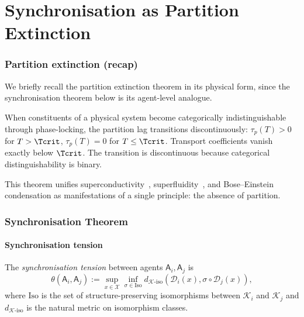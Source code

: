 \documentclass[11pt,twocolumn,a4paper]{article}
\newcommand{\K}{\mathcal{K}}
\newcommand{\D}{\mathcal{D}}
\newcommand{\X}{\mathcal{X}}
\newcommand{\agent}{\mathsf{A}}
\newcommand{\tauP}{\tau_p}
\begin{document}
\part{Synchronisation as Partition Extinction}

\section{Partition extinction (recap)}
\label{sec:partition-extinct}

We briefly recall the partition extinction theorem in its physical
form, since the synchronisation theorem below is its agent-level
analogue.

\begin{theorem}\label{thm:pe}
When constituents of a physical system become categorically
indistinguishable through phase-locking, the partition lag transitions
discontinuously: $\tauP(T)>0$ for $T>\Tcrit$, $\tauP(T)=0$ for
$T\le\Tcrit$. Transport coefficients vanish exactly below $\Tcrit$.
The transition is discontinuous because categorical distinguishability
is binary.
\end{theorem}

This theorem unifies superconductivity~\cite{onnes1911,bardeen1957},
superfluidity~\cite{landau1941}, and Bose--Einstein condensation as
manifestations of a single principle: the absence of partition.

\section{Synchronisation Theorem}
\label{sec:synchronisation}

\subsection{Synchronisation tension}

\begin{definition}\label{def:sync-tens}
The \emph{synchronisation tension} between agents $\agent_i,\agent_j$
is
\[
\theta(\agent_i,\agent_j):=\sup_{x\in\X}\inf_{\sigma\in\mathrm{Iso}}
d_{\K\text{-iso}}(\D_i(x),\sigma\circ\D_j(x)),
\]
where $\mathrm{Iso}$ is the set of structure-preserving isomorphisms
between $\K_i$ and $\K_j$ and $d_{\K\text{-iso}}$ is the natural metric
on isomorphism classes.
\end{definition}
\end{document}
